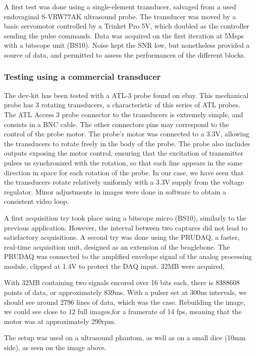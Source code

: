 \documentclass[letterpaper, 10 pt, conference]{ieeeconf} %
\begin{document}
A first test was done using a single-element transducer, salvaged from a used endovaginal S-VRW77AK ultrasound probe. The transducer was moved by a basic servomotor controlled by a Trinket Pro 5V, which doubled as the controller sending the pulse commands. Data was acquired on the first iteration at 5Msps with a bitscope unit (BS10). Noise kept the SNR low, but nonetheless provided a source of data, and permitted to assess the performances of the different blocks.

\subsubsection{Testing using a commercial transducer}

The dev-kit has been tested with a ATL-3 probe found on ebay. This mechanical probe has 3 rotating transducers, a characteristic of this series of ATL probes. The ATL Access 3 probe connector to the transducers is extremely simple, and consists in a BNC cable. The other connectors pins may correspond to the control of the probe motor. The probe's motor was connected to a 3.3V, allowing the transducers to rotate freely in the body of the probe. The probe also includes outputs exposing the motor control, ensuring that the excitation of transmitter pulses us synchronized with the rotation, so that each line appears in the same direction in space for each rotation of the probe. In our case, we have seen that the transducers rotate relatively uniformly with a 3.3V supply from the voltage regulator. Minor adjustments in images were done in software to obtain a consistent video loop.

A first acquisition try took place using a bitscope micro (BS10), similarly to the previous application. However, the interval between two captures did not lead to satisfactory acquisitions. A second try was done using the PRUDAQ, a faster, real-time acquisition unit, designed as an extension of the beaglebone. The PRUDAQ was connected to the amplified envelope signal of the analog processing module, clipped at 1.4V to protect the DAQ input. 32MB were acquired,

With 32MB containing two signals encored over 16 bits each, there is 8388608 points of data, or approximately 839ms. With a pulser set at 300us intervals, we should see around 2796 lines of data, which was the case. Rebuilding the image, we could see close to 12 full images,for a framerate of 14 fps, meaning that the motor was at approximately 290rpm.

The setup was used on a ultrasound phantom, as well as on a small dice (10mm side), as seen on the image above.
\end{document}
